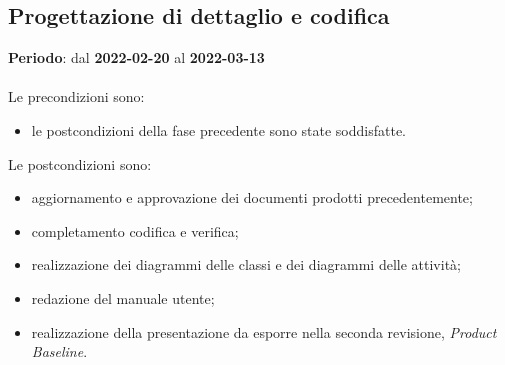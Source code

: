 \subsection{Progettazione di dettaglio e codifica}
\textbf{Periodo}: dal \textbf{2022-02-20} al \textbf{2022-03-13} \mbox{} \\ \mbox{} \\

Le precondizioni sono:
\begin{itemize}
\item le postcondizioni della fase precedente sono state soddisfatte.
\end{itemize}

Le postcondizioni sono:
\begin{itemize}
\item aggiornamento e approvazione dei documenti prodotti precedentemente;
\item completamento codifica e verifica;
\item realizzazione dei diagrammi delle classi e dei diagrammi delle attività;
\item redazione del manuale utente;
\item realizzazione della presentazione da esporre nella seconda revisione, \textit{Product Baseline}. 
\end{itemize}

